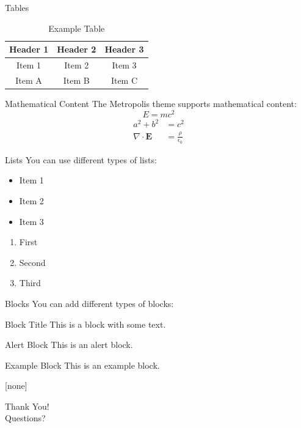 \documentclass{beamer}
\begin{document}
\begin{frame}{Tables}
  \begin{table}
    \centering
    \begin{tabular}{|c|c|c|}
      \hline
      Header 1 & Header 2 & Header 3 \\
      \hline
      Item 1 & Item 2 & Item 3 \\
      Item A & Item B & Item C \\
      \hline
    \end{tabular}
    \caption{Example Table}
  \end{table}
\end{frame}

\begin{frame}{Mathematical Content}
  The Metropolis theme supports mathematical content:
  \begin{equation}
    E = mc^2
  \end{equation}
  \begin{align}
    a^2 + b^2 &= c^2 \\
    \nabla \cdot \mathbf{E} &= \frac{\rho}{\epsilon_0}
  \end{align}
\end{frame}

\begin{frame}{Lists}
  You can use different types of lists:

  \begin{itemize}
    \item Item 1
    \item Item 2
    \item Item 3
  \end{itemize}

  \begin{enumerate}
    \item First
    \item Second
    \item Third
  \end{enumerate}

\end{frame}

\begin{frame}{Blocks}
  You can add different types of blocks:
  \begin{block}{Block Title}
    This is a block with some text.
  \end{block}
  \begin{alertblock}{Alert Block}
    This is an alert block.
  \end{alertblock}
  \begin{exampleblock}{Example Block}
    This is an example block.
  \end{exampleblock}

\end{frame}

[none]
{
\begin{frame}[standout]
  Thank You!\\Questions?
\end{frame}
}
\end{document}
